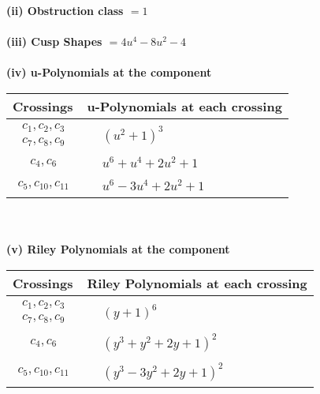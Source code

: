 \documentclass[1p]{elsarticle_modified}
\theoremstyle{definition}
\begin{document}
\flushleft \textbf{(ii) Obstruction class $= 1$}\\~\\
\flushleft \textbf{(iii) Cusp Shapes $= 4 u^4-8 u^2-4$}\\~\\
\newpage\renewcommand{\arraystretch}{1}
\flushleft \textbf{(iv) u-Polynomials at the component}\newline \\
\begin{tabular}{m{50pt}|m{274pt}}
Crossings & \hspace{64pt}u-Polynomials at each crossing \\
\hline $$\begin{aligned}c_{1},c_{2},c_{3}\\c_{7},c_{8},c_{9}\end{aligned}$$&$\begin{aligned}
&(u^2+1)^3
\end{aligned}$\\
\hline $$\begin{aligned}c_{4},c_{6}\end{aligned}$$&$\begin{aligned}
&u^6+u^4+2 u^2+1
\end{aligned}$\\
\hline $$\begin{aligned}c_{5},c_{10},c_{11}\end{aligned}$$&$\begin{aligned}
&u^6-3 u^4+2 u^2+1
\end{aligned}$\\
\hline
\end{tabular}\\~\\
\newpage\renewcommand{\arraystretch}{1}
\flushleft \textbf{(v) Riley Polynomials at the component}\newline \\
\begin{tabular}{m{50pt}|m{274pt}}
Crossings & \hspace{64pt}Riley Polynomials at each crossing \\
\hline $$\begin{aligned}c_{1},c_{2},c_{3}\\c_{7},c_{8},c_{9}\end{aligned}$$&$\begin{aligned}
&(y+1)^6
\end{aligned}$\\
\hline $$\begin{aligned}c_{4},c_{6}\end{aligned}$$&$\begin{aligned}
&(y^3+y^2+2 y+1)^2
\end{aligned}$\\
\hline $$\begin{aligned}c_{5},c_{10},c_{11}\end{aligned}$$&$\begin{aligned}
&(y^3-3 y^2+2 y+1)^2
\end{aligned}$\\
\hline
\end{tabular}\\~\\
\end{document}
